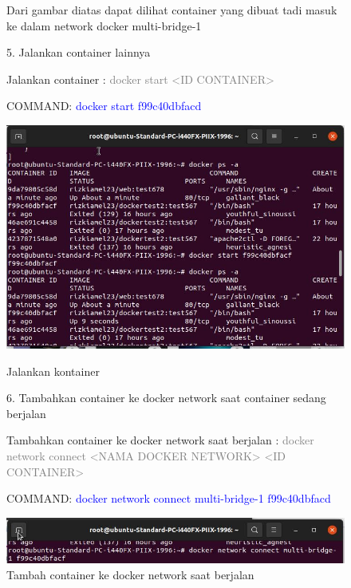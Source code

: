 \begin{figure}
    Dari gambar diatas dapat dilihat container yang dibuat tadi masuk ke dalam network docker multi-bridge-1
    
    5.  Jalankan container lainnya

    Jalankan container : \textcolor{Gray}{docker start <ID CONTAINER>}

    COMMAND: \textcolor{Blue}{docker start f99c40dbfacd}
        \begin{center}
            \includegraphics[width=\linewidth]{image/57.jpg}
            \caption{Jalankan kontainer}
            \label{fig:my_figure}
        \end{center}

    6. Tambahkan container ke docker network saat container sedang berjalan

    Tambahkan container ke docker network saat berjalan : \textcolor{Gray}{docker network connect <NAMA DOCKER NETWORK> <ID CONTAINER>}
    
    COMMAND: \textcolor{Blue}{docker network connect multi-bridge-1 f99c40dbfacd}
        \begin{center}
            \includegraphics[width=\linewidth]{image/58.jpg}
            \caption{Tambah container ke docker network saat berjalan}
            \label{fig:my_figure}
        \end{center}
\end{figure}

